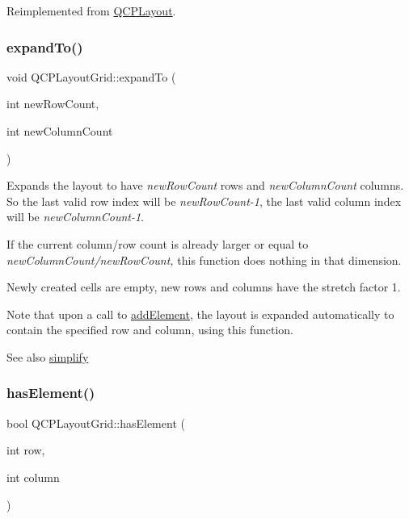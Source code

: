 Reimplemented from \hyperlink{class_q_c_p_layout_aca129722c019f91d3367046f80abfa77}{Q\+C\+P\+Layout}.

\mbox{\label{class_q_c_p_layout_grid_a886c0dcbabd51a45da399e044552b685}} 
\subsubsection{\texorpdfstring{expand\+To()}{expandTo()}}
{\footnotesize\ttfamily void Q\+C\+P\+Layout\+Grid\+::expand\+To (\begin{DoxyParamCaption}\item[{int}]{new\+Row\+Count,  }\item[{int}]{new\+Column\+Count }\end{DoxyParamCaption})}

Expands the layout to have {\itshape new\+Row\+Count} rows and {\itshape new\+Column\+Count} columns. So the last valid row index will be {\itshape new\+Row\+Count-\/1}, the last valid column index will be {\itshape new\+Column\+Count-\/1}.

If the current column/row count is already larger or equal to {\itshape new\+Column\+Count/{\itshape new\+Row\+Count},} this function does nothing in that dimension.

Newly created cells are empty, new rows and columns have the stretch factor 1.

Note that upon a call to \hyperlink{class_q_c_p_layout_grid_adff1a2ca691ed83d2d24a4cd1fe17012}{add\+Element}, the layout is expanded automatically to contain the specified row and column, using this function.

\begin{DoxySeeAlso}{See also}
\hyperlink{class_q_c_p_layout_grid_a38621ca7aa633b6a9a88617df7f08672}{simplify} 
\end{DoxySeeAlso}
\mbox{\label{class_q_c_p_layout_grid_ab0cf4f7edc9414a3bfaddac0f46dc0a0}} 
\subsubsection{\texorpdfstring{has\+Element()}{hasElement()}}
{\footnotesize\ttfamily bool Q\+C\+P\+Layout\+Grid\+::has\+Element (\begin{DoxyParamCaption}\item[{int}]{row,  }\item[{int}]{column }\end{DoxyParamCaption})}

